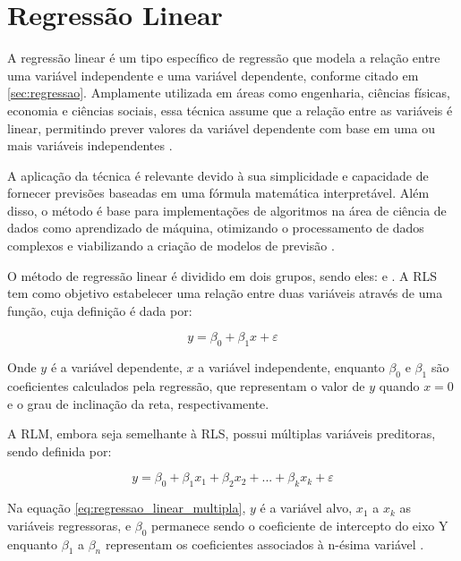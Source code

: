 \section{Regressão Linear}
\label{sec:regressao-linear}

A regressão linear é um tipo específico de regressão que modela a relação entre uma variável independente e uma variável dependente, conforme citado em \ref{sec:regressao}. Amplamente utilizada em áreas como engenharia, ciências físicas, economia e ciências sociais, essa técnica assume que a relação entre as variáveis é linear, permitindo prever valores da variável dependente com base em uma ou mais variáveis independentes \cite{montgomery2012}.

A aplicação da técnica é relevante devido à sua simplicidade e capacidade de fornecer previsões baseadas em uma fórmula matemática interpretável. Além disso, o método é base para implementações de algoritmos na área de ciência de dados como aprendizado de máquina, otimizando o processamento de dados complexos e viabilizando a criação de modelos de previsão \cite{aws2024}.

O método de regressão linear é dividido em dois grupos, sendo eles:  e  \cite{montgomery2012}. A RLS tem como objetivo estabelecer uma relação entre duas variáveis através de uma função, cuja definição é dada por:

\begin{equation}
	y = \beta_0 + \beta_1 x + \varepsilon
	\label{eq:regressao_linear_simples}
\end{equation}

Onde $y$ é a variável dependente, $x$ a variável independente, enquanto $\beta_0$ e $\beta_1$ são coeficientes calculados pela regressão, que representam o valor de $y$ quando $x=0$ e o grau de inclinação da reta, respectivamente.

A RLM, embora seja semelhante à RLS, possui múltiplas variáveis preditoras, sendo definida por:

\begin{equation}
	y = \beta_0 + \beta_1 x_{1} + \beta_2 x_{2} + ... + \beta_k x_{k} + \varepsilon
	\label{eq:regressao_linear_multipla}
\end{equation}

Na equação \ref{eq:regressao_linear_multipla}, $y$ é a variável alvo, $x_{1}$ a $x_{k}$ as variáveis regressoras, e $\beta_0$ permanece sendo o coeficiente de intercepto do eixo Y enquanto $\beta_1$ a $\beta_n$ representam os coeficientes associados à n-ésima variável \cite{sassi2012}.

